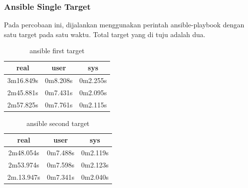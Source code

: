 \documentclass[10pt,]{report}
\begin{document}
\begin{adjustwidth}{20pt}{}
	\subsubsection{Ansible Single Target}
	\begin{adjustwidth}{20pt}{}
		Pada percobaan ini, dijalankan menggunakan perintah ansible-playbook dengan
		satu target pada satu waktu. Total target yang di tuju adalah dua.
		\begin{table}[H]
			\caption{ansible first target}
			\begin{center}
				\begin{tabular}[c]{|c|c|c|}
					\hline
					\multicolumn{1}{|c|}{\textbf{real}} &
					\multicolumn{1}{c|}{\textbf{user}}  &
					\multicolumn{1}{c|}{\textbf{sys}}                         \\
					\hline
					3m16.849s                           & 0m8.208s & 0m2.255s \\
					\hline
					2m45.881s                           & 0m7.431s & 0m2.095s \\
					\hline
					2m57.825s                           & 0m7.761s & 0m2.115s \\
					\hline
				\end{tabular}
			\end{center}
		\end{table}
		\vspace{-5mm}
		\begin{table}[H]
			\caption{ansible second target}
			\begin{center}
				\begin{tabular}[c]{|c|c|c|}
					\hline
					\multicolumn{1}{|c|}{\textbf{real}} &
					\multicolumn{1}{c|}{\textbf{user}}  &
					\multicolumn{1}{c|}{\textbf{sys}}                         \\
					\hline
					2m48.054s                           & 0m7.488s & 0m2.119s \\
					\hline
					2m53.974s                           & 0m7.598s & 0m2.123s \\
					\hline
					2m.13.947s                          & 0m7.341s & 0m2.040s \\
					\hline
				\end{tabular}
			\end{center}
		\end{table}
	\end{adjustwidth}

\end{adjustwidth}
\end{document}
